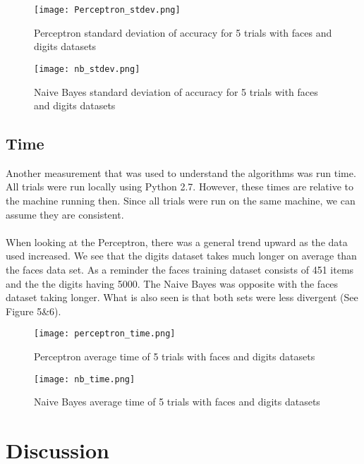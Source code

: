 \documentclass[titlepage]{article}
\begin{document}
\begin{figure}[H]
\centering
\texttt{[image: Perceptron\_stdev.png]}
\caption{Perceptron standard deviation of accuracy for 5 trials with faces and digits datasets}
\end{figure}

\begin{figure}[H]
\centering
\texttt{[image: nb\_stdev.png]}
\caption{Naive Bayes standard deviation of accuracy for 5 trials with faces and digits datasets}
\end{figure}

\subsection{Time}
Another measurement that was used to understand the algorithms was run time. All trials were run locally using Python 2.7. However, these times are relative to the machine running then. Since all trials were run on the same machine, we can assume they are consistent.\\
\\
When looking at the Perceptron, there was a general trend upward as the data used increased. We see that the digits dataset takes much longer on average than the faces data set. As a reminder the faces training dataset consists of 451 items and the the digits having 5000. The Naive Bayes was opposite with the faces dataset taking longer. What is also seen is that both sets were less divergent (See Figure 5\&6).

\begin{figure}[H]
\centering
\texttt{[image: perceptron\_time.png]}
\caption{Perceptron average time of 5 trials with faces and digits datasets}
\end{figure}

\begin{figure}[H]
\centering
\texttt{[image: nb\_time.png]}
\caption{Naive Bayes average time of 5 trials with faces and digits datasets}
\end{figure}

\section{Discussion}
\end{document}
